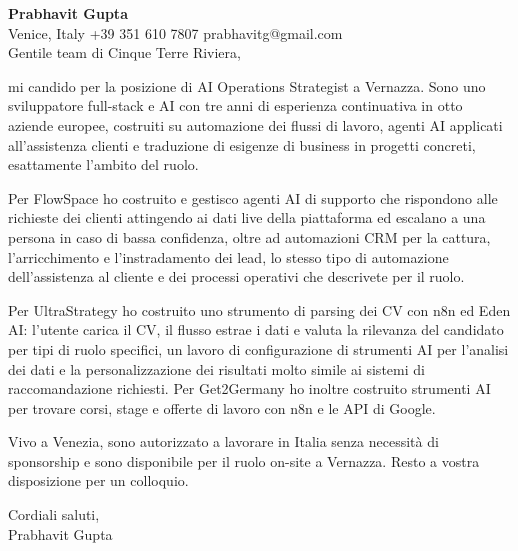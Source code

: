 \documentclass[a4paper,10.5pt]{article}
\begin{document}
\textbf{Prabhavit Gupta}\\
Venice, Italy \textbar{} +39 351 610 7807 \textbar{} prabhavitg@gmail.com\\[10pt]
Gentile team di Cinque Terre Riviera,

mi candido per la posizione di AI Operations Strategist a Vernazza. Sono uno sviluppatore full-stack e AI con tre anni di esperienza continuativa in otto aziende europee, costruiti su automazione dei flussi di lavoro, agenti AI applicati all'assistenza clienti e traduzione di esigenze di business in progetti concreti, esattamente l'ambito del ruolo.

Per FlowSpace ho costruito e gestisco agenti AI di supporto che rispondono alle richieste dei clienti attingendo ai dati live della piattaforma ed escalano a una persona in caso di bassa confidenza, oltre ad automazioni CRM per la cattura, l'arricchimento e l'instradamento dei lead, lo stesso tipo di automazione dell'assistenza al cliente e dei processi operativi che descrivete per il ruolo.

Per UltraStrategy ho costruito uno strumento di parsing dei CV con n8n ed Eden AI: l'utente carica il CV, il flusso estrae i dati e valuta la rilevanza del candidato per tipi di ruolo specifici, un lavoro di configurazione di strumenti AI per l'analisi dei dati e la personalizzazione dei risultati molto simile ai sistemi di raccomandazione richiesti. Per Get2Germany ho inoltre costruito strumenti AI per trovare corsi, stage e offerte di lavoro con n8n e le API di Google.

Vivo a Venezia, sono autorizzato a lavorare in Italia senza necessità di sponsorship e sono disponibile per il ruolo on-site a Vernazza. Resto a vostra disposizione per un colloquio.

Cordiali saluti,\\
Prabhavit Gupta
\end{document}
